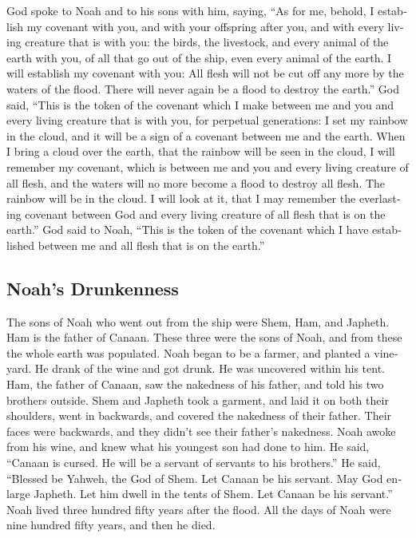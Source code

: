 \begin{paracol}{2}
\begin{otherlanguage}{english}
 God spoke to Noah and to his sons with him, saying,
 ``As for me, behold, I establish my covenant with you,
and with your offspring after you,  and with every living
creature that is with you: the birds, the livestock, and every animal of
the earth with you, of all that go out of the ship, even every animal of
the earth.  I will establish my covenant with you: All
flesh will not be cut off any more by the waters of the flood. There
will never again be a flood to destroy the earth.''  God
said, ``This is the token of the covenant which I make between me and
you and every living creature that is with you, for perpetual
generations:  I set my rainbow in the cloud, and it will
be a sign of a covenant between me and the earth.  When I
bring a cloud over the earth, that the rainbow will be seen in the
cloud,  I will remember my covenant, which is between me
and you and every living creature of all flesh, and the waters will no
more become a flood to destroy all flesh.  The rainbow
will be in the cloud. I will look at it, that I may remember the
everlasting covenant between God and every living creature of all flesh
that is on the earth.''  God said to Noah, ``This is the
token of the covenant which I have established between me and all flesh
that is on the earth.''

\hypertarget{noahs-drunkenness}{%
\subsection{Noah's Drunkenness}\label{noahs-drunkenness}}

 The sons of Noah who went out from the ship were Shem,
Ham, and Japheth. Ham is the father of Canaan.  These
three were the sons of Noah, and from these the whole earth was
populated.  Noah began to be a farmer, and planted a
vineyard.  He drank of the wine and got drunk. He was
uncovered within his tent.  Ham, the father of Canaan,
saw the nakedness of his father, and told his two brothers outside.
 Shem and Japheth took a garment, and laid it on both
their shoulders, went in backwards, and covered the nakedness of their
father. Their faces were backwards, and they didn't see their father's
nakedness.  Noah awoke from his wine, and knew what his
youngest son had done to him.  He said, ``Canaan is
cursed. He will be a servant of servants to his brothers.''
 He said, ``Blessed be Yahweh, the God of Shem. Let
Canaan be his servant.  May God enlarge Japheth. Let him
dwell in the tents of Shem. Let Canaan be his servant.'' 
Noah lived three hundred fifty years after the flood. 
All the days of Noah were nine hundred fifty years, and then he died.


\end{otherlanguage}
\end{paracol}
